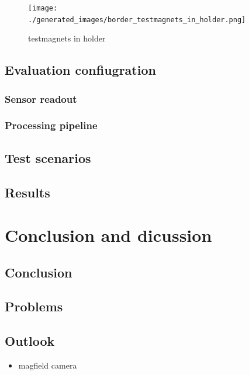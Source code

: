 \begin{figure}
\centering
\texttt{[image: ./generated\_images/border\_testmagnets\_in\_holder.png]}
\caption{testmagnets in holder \label{testmagnets_in_holder.png}}
\end{figure}

\hypertarget{evaluation-confiugration}{%
\section{Evaluation confiugration}\label{evaluation-confiugration}}

\hypertarget{sensor-readout}{%
\subsection{Sensor readout}\label{sensor-readout}}

\hypertarget{processing-pipeline}{%
\subsection{Processing pipeline}\label{processing-pipeline}}

\hypertarget{test-scenarios}{%
\section{Test scenarios}\label{test-scenarios}}

\hypertarget{results}{%
\section{Results}\label{results}}

\hypertarget{conclusion-and-dicussion}{%
\chapter{Conclusion and dicussion}\label{conclusion-and-dicussion}}

\hypertarget{conclusion}{%
\section{Conclusion}\label{conclusion}}

\hypertarget{problems}{%
\section{Problems}\label{problems}}

\hypertarget{outlook}{%
\section{Outlook}\label{outlook}}

\begin{itemize}
\tightlist
\item
  magfield camera
\end{itemize}

